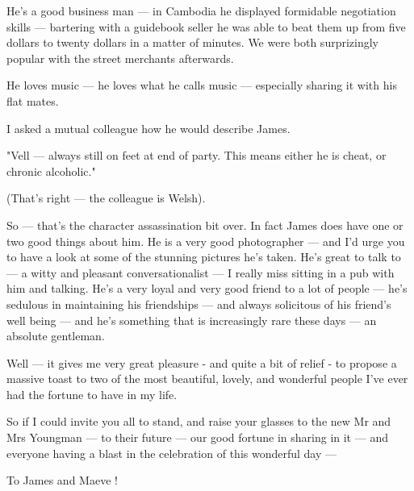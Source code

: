 He's a good business man --- in Cambodia he displayed formidable
negotiation skills --- bartering with a guidebook seller he was able
to beat them up from five dollars to twenty dollars in a matter of
minutes. We were both surprizingly popular with the street merchants
afterwards.

He loves music --- he loves what he calls music --- especially sharing
it with his flat mates.

I asked a mutual colleague how he would describe James.

"Vell --- always still on feet at end of party. This means either he
is cheat, or chronic alcoholic."

(That's right --- the colleague is Welsh).

\bigskip
So --- that's the character assassination bit over. In fact James does
have one or two good things about him. He {\notefont is} a very good
photographer --- and I'd urge you to have a look at some of the
stunning pictures he's taken. He's great to talk to --- a witty and
pleasant conversationalist --- I really miss sitting in a pub with him
and talking. He's a very loyal and very good friend to a lot of people
--- he's sedulous in maintaining his friendships --- and always
solicitous of his friend's well being --- and he's something that is
increasingly rare these days --- an absolute gentleman.

\bigskip{}

Well --- it gives me very great pleasure - and quite a bit of relief -
to propose a massive toast to two of the most beautiful, lovely, and
wonderful people I've ever had the fortune to have in my life.

So if I could invite you all to stand, and raise your glasses to the
new Mr and Mrs Youngman --- to their future --- our good fortune in
sharing in it --- and everyone having a blast in the celebration of
this wonderful day ---

To James and Maeve !

\bye

